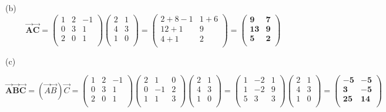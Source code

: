 \documentclass[12pt]{article}
\begin{document}
\hfill \break
(b)
$$
\boldsymbol{\vec{A}\vec{C}} = 
\begin{pmatrix}
    1 & 2 & -1 \\
	0 & 3 & 1  \\
	2 & 0 & 1 \\
\end{pmatrix}
\begin{pmatrix}
    2 & 1 \\
	4 & 3 \\
	1 & 0\\
\end{pmatrix}=
\begin{pmatrix}
    2+8-1 & 1+6 \\
	12+1 & 9 \\
	4+1 & 2\\
\end{pmatrix} =
\boldsymbol{
\begin{pmatrix}
    9 & 7 \\
	13 & 9 \\
	5 & 2\\
\end{pmatrix}
}
$$

\hfill \break
(c)

$$
\boldsymbol{\vec{A}\vec{B}\vec{C}} = (\vec{A}\vec{B})\vec{C} =
\begin{pmatrix}
    1 & 2 & -1 \\
	0 & 3 & 1  \\
	2 & 0 & 1 \\
\end{pmatrix}
\begin{pmatrix}
    2 & 1 & 0 \\
	0 & -1 & 2\\
	1 & 1 & 3 \\
\end{pmatrix}
\begin{pmatrix}
    2 & 1 \\
	4 & 3 \\
	1 & 0\\
\end{pmatrix} = 
\begin{pmatrix}
    1 & -2 & 1 \\
	1 & -2 & 9\\
	5 & 3 & 3 \\
\end{pmatrix}
\begin{pmatrix}
    2 & 1 \\
	4 & 3 \\
	1 & 0\\
\end{pmatrix} = 
\boldsymbol{
\begin{pmatrix}
    -5 & -5 \\
	3 & -5 \\
	25 & 14\\
\end{pmatrix}
}
$$
\end{document}
